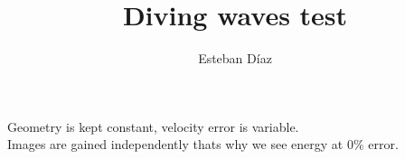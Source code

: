 



\title[]{Diving waves test}
\subtitle{}
\author[]{Esteban  D\'{i}az}
\date{}
\logo{}

\def\big#1{\begin{center} \LARGE \textbf{#1} \end{center}}
\def\cen#1{\begin{center}        \textbf{#1} \end{center}}

 { \cwpcover }

\begin{frame}

\end{frame}


\begin{frame}
Geometry is kept constant, velocity error is variable.\\
Images are gained independently thats why we see energy at 0\% error.
\end{frame}

\begin{frame}\end{frame}
\begin{frame}\end{frame}
\begin{frame}\end{frame}
\begin{frame}\end{frame}
\begin{frame}\end{frame}
\begin{frame}\end{frame}


